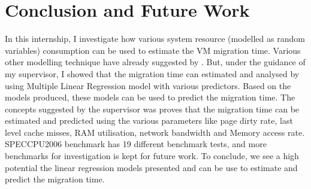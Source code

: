 \documentclass[a4paper,10pt,twoside]{article}
\begin{document}
\section{Conclusion and Future Work}
In this internship, I investigate how various system resource (modelled as random variables) consumption can be used to estimate the VM migration time. Various other modelling technique have already suggested by \cite{liu2013performance}. But, under the guidance  of my supervisor, I showed that the migration time can estimated and analysed by using Multiple Linear Regression model with various predictors. Based on the models produced, these models can be used to predict the migration time. The concepts suggested by the supervisor was proves that the migration time can be estimated and predicted using the various parameters like page dirty rate, last level cache misses, RAM utilisation, network bandwidth and Memory access rate. SPECCPU2006 benchmark has 19 different benchmark tests, and more benchmarks for investigation is kept for future work. To conclude, we see a high potential the linear regression models presented and can be use to estimate and predict the migration time.

 
\end{document}
